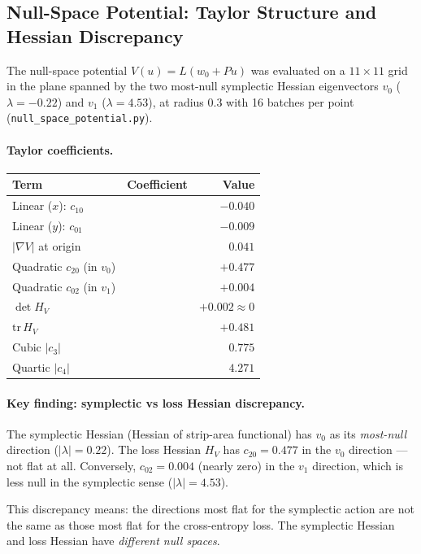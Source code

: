 \documentclass[11pt]{amsart}
\begin{document}
\subsection{Null-Space Potential: Taylor Structure and Hessian Discrepancy}
\label{sec:null_potential}

The null-space potential $V(u) = L(w_0 + Pu)$ was evaluated on a
$11\times11$ grid in the plane spanned by the two most-null symplectic
Hessian eigenvectors $v_0$ ($\lambda=-0.22$) and $v_1$ ($\lambda=4.53$),
at radius $0.3$ with 16 batches per point
(\texttt{null\_space\_potential.py}).

\paragraph{Taylor coefficients.}

\begin{center}
\small
\begin{tabular}{@{}llr@{}}
\toprule
Term & Coefficient & Value \\
\midrule
Linear ($x$): $c_{10}$ & & $-0.040$ \\
Linear ($y$): $c_{01}$ & & $-0.009$ \\
$|\nabla V|$ at origin & & $0.041$ \\
Quadratic $c_{20}$ (in $v_0$) & & $+0.477$ \\
Quadratic $c_{02}$ (in $v_1$) & & $+0.004$ \\
$\det H_V$ & & $+0.002 \approx 0$ \\
$\mathrm{tr}\, H_V$ & & $+0.481$ \\
Cubic $|c_3|$ & & $0.775$ \\
Quartic $|c_4|$ & & $4.271$ \\
\bottomrule
\end{tabular}
\end{center}

\paragraph{Key finding: symplectic vs loss Hessian discrepancy.}

The symplectic Hessian (Hessian of strip-area functional)
has $v_0$ as its \emph{most-null} direction ($|\lambda| = 0.22$).
The loss Hessian $H_V$ has $c_{20} = 0.477$ in the $v_0$ direction ---
not flat at all.
Conversely, $c_{02} = 0.004$ (nearly zero) in the $v_1$ direction,
which is less null in the symplectic sense ($|\lambda| = 4.53$).

This discrepancy means: the directions most flat for the symplectic
action are not the same as those most flat for the cross-entropy loss.
The symplectic Hessian and loss Hessian have \emph{different null spaces}.
\end{document}
